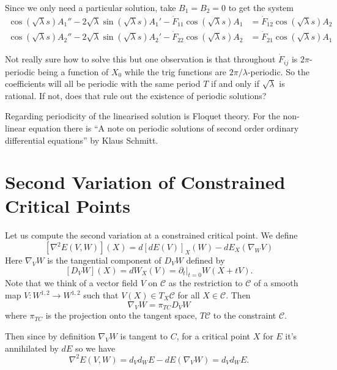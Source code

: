 \documentclass[12pt]{article}
\begin{document}
Since we only need a particular solution, take \(B_1 = B_2 = 0\) to get the system
\[
\begin{split}
\cos(\sqrt{\lambda} s) A_1'' - 2 \sqrt{\lambda} \sin(\sqrt{\lambda} s) A_1' - \dot{F}_{11} \cos(\sqrt{\lambda} s) A_1  &= \dot{F}_{12} \cos(\sqrt{\lambda} s) A_2 \\
\cos(\sqrt{\lambda} s) A_2'' - 2 \sqrt{\lambda} \sin(\sqrt{\lambda} s) A_2' - \dot{F}_{22} \cos(\sqrt{\lambda} s) A_2 &= \dot{F}_{21} \cos(\sqrt{\lambda} s) A_1
\end{split}
\]

{\color{red} Not really sure how to solve this but one observation is that throughout \(\dot{F}_{ij}\) is \(2\pi\)-periodic being a function of \(X_0\) while the trig functions are \(2\pi/\lambda\)-periodic. So the coefficients will all be periodic with the same period \(T\) if and only if \(\sqrt{\lambda}\) is rational. If not, does that rule out the existence of periodic solutions?}

{\color{red} Regarding periodicity of the linearised solution is Floquet theory. For the non-linear equation there is ``A note on periodic solutions of second order ordinary differential equations'' by Klaus Schmitt.}

\section{Second Variation of Constrained Critical Points}

Let us compute the second variation at a constrained critical point. We define
\[
[\nabla^2 E(V, W)] (X) = d[dE(V)]_X (W) - dE_X(\nabla_W V)
\]
Here \(\nabla_V W\) is the tangential component of \(D_V W\) defined by
\[
[D_V W] (X) = dW_X(V) = \partial_t|_{t=0} W(X + t V).
\]
Note that we think of a vector field \(V\) on \(\mathcal{C}\) as the restriction to \(\mathcal{C}\) of a smooth map \(V : W^{1,2} \to W^{1,2}\) such that \(V(X) \in T_X \mathcal{C}\) for all \(X \in \mathcal{C}\). Then
\[
\nabla_V W = \pi_{TC} D_V W
\]
where \(\pi_{TC}\) is the projection onto the tangent space, \(T\mathcal{C}\) to the constraint \(\mathcal{C}\).

Then since by definition \(\nabla_V W\) is tangent to \(C\), for a critical point \(X\) for \(E\) it's annihilated by \(dE\) so we have
\[
\nabla^2 E(V, W) = d_V d_W E - dE(\nabla_V W) = d_V d_W E.
\]
\end{document}
